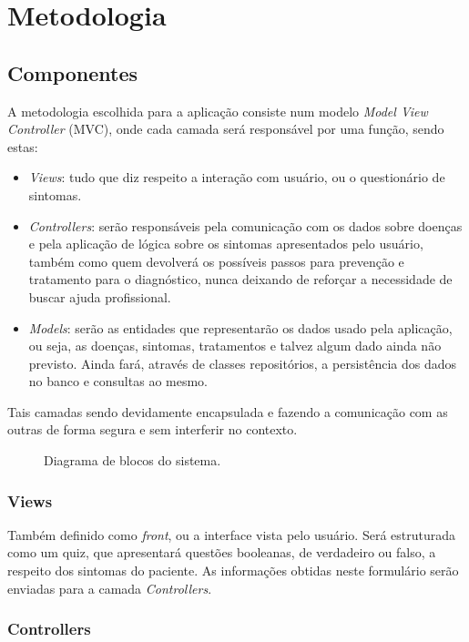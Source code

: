 \section{Metodologia}

\subsection{Componentes}

A metodologia escolhida para a aplicação consiste num modelo \emph{Model View Controller} (MVC), onde cada camada será responsável por uma função, sendo estas:
\begin{itemize}
    \item \emph{Views}: tudo que diz respeito a interação com usuário, ou o questionário de sintomas.
    \item \emph{Controllers}: serão responsáveis pela comunicação com os dados sobre doenças e pela aplicação de lógica sobre os sintomas apresentados pelo usuário, também como quem devolverá os possíveis passos para prevenção e tratamento para o diagnóstico, nunca deixando de reforçar a necessidade de buscar ajuda profissional.
    \item \emph{Models}: serão as entidades que representarão os dados usado pela aplicação, ou seja, as doenças, sintomas, tratamentos e talvez algum dado ainda não previsto. Ainda fará, através de classes repositórios, a persistência dos dados no banco e consultas ao mesmo.
\end{itemize}

Tais camadas sendo devidamente encapsulada e fazendo a comunicação com as outras de forma segura e sem interferir no contexto.

\begin{figure}
    \centering
    
    \caption{Diagrama de blocos do sistema.}
    \label{fig:my_label}
\end{figure}

\subsubsection{Views}

Também definido como \emph{front}, ou a interface vista pelo usuário. Será estruturada como um quiz, que apresentará questões booleanas, de verdadeiro ou falso, a respeito dos sintomas do paciente.
As informações obtidas neste formulário serão enviadas para a camada \emph{Controllers}.

\subsubsection{Controllers}

